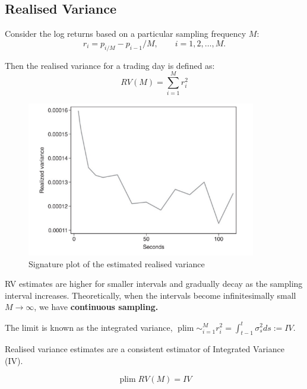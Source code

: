 \documentclass[11pt]{article}
\begin{document}
\subsection{Realised Variance}

\begin{definition}
    Consider the log returns based on a particular sampling frequency $M$:
    \[r_i = p_{i/M} - p_{i-1}/M, \qquad i=1,2,\ldots, M.\]

    Then the realised variance for a trading day is defined as:
    \begin{equation}
        \label{Realised Variance}
        RV(M) = \sum_{i=1}^M r_i^2
    \end{equation}
\end{definition}
\newpage
\begin{figure}[h]
    \centering
    \includegraphics[width=10cm]{pics/RV signature plot.png}
    \caption{Signature plot of the estimated realised variance}
    \label{fig: RV signature}
\end{figure}

RV estimates are higher for smaller intervals and gradually decay as the sampling interval increases. Theoretically, when the intervals become infinitesimally small $M\rightarrow\infty$, we have \textbf{continuous sampling.}

The limit is known as the integrated variance, $\operatorname{plim}\sim_{i=1}^M r_i^2 = \int_{t-1}^t \sigma_s^2 ds:=IV$.

Realised variance estimates are a consistent estimator of Integrated Variance (IV).
\begin{mdframed}
    \[\operatorname{plim} RV(M) = IV\]
\end{mdframed}
\end{document}
